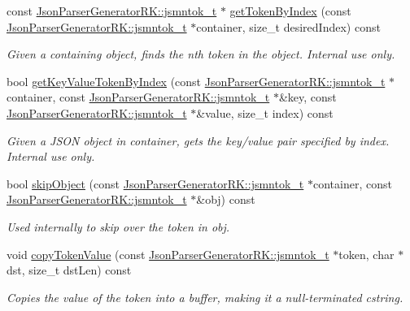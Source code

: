 \begin{DoxyCompactItemize}
const \hyperlink{struct_json_parser_generator_r_k_1_1jsmntok__t}{Json\+Parser\+Generator\+R\+K\+::jsmntok\+\_\+t} $\ast$ \hyperlink{class_json_parser_a588d9c4fcfe9179db67ca42f5ba5229d}{get\+Token\+By\+Index} (const \hyperlink{struct_json_parser_generator_r_k_1_1jsmntok__t}{Json\+Parser\+Generator\+R\+K\+::jsmntok\+\_\+t} $\ast$container, size\+\_\+t desired\+Index) const
\begin{DoxyCompactList}\small\item\em Given a containing object, finds the nth token in the object. Internal use only. \end{DoxyCompactList}\item 
bool \hyperlink{class_json_parser_a946929ab0c54eed7e7c8697e9304d553}{get\+Key\+Value\+Token\+By\+Index} (const \hyperlink{struct_json_parser_generator_r_k_1_1jsmntok__t}{Json\+Parser\+Generator\+R\+K\+::jsmntok\+\_\+t} $\ast$container, const \hyperlink{struct_json_parser_generator_r_k_1_1jsmntok__t}{Json\+Parser\+Generator\+R\+K\+::jsmntok\+\_\+t} $\ast$\&key, const \hyperlink{struct_json_parser_generator_r_k_1_1jsmntok__t}{Json\+Parser\+Generator\+R\+K\+::jsmntok\+\_\+t} $\ast$\&value, size\+\_\+t index) const
\begin{DoxyCompactList}\small\item\em Given a J\+S\+ON object in container, gets the key/value pair specified by index. Internal use only. \end{DoxyCompactList}\item 
bool \hyperlink{class_json_parser_a182ab93b3639f0a99f37f9101eb48361}{skip\+Object} (const \hyperlink{struct_json_parser_generator_r_k_1_1jsmntok__t}{Json\+Parser\+Generator\+R\+K\+::jsmntok\+\_\+t} $\ast$container, const \hyperlink{struct_json_parser_generator_r_k_1_1jsmntok__t}{Json\+Parser\+Generator\+R\+K\+::jsmntok\+\_\+t} $\ast$\&obj) const
\begin{DoxyCompactList}\small\item\em Used internally to skip over the token in obj. \end{DoxyCompactList}\item 
void \hyperlink{class_json_parser_ab7f8a2873dd3a2935cf0a22133a5378f}{copy\+Token\+Value} (const \hyperlink{struct_json_parser_generator_r_k_1_1jsmntok__t}{Json\+Parser\+Generator\+R\+K\+::jsmntok\+\_\+t} $\ast$token, char $\ast$dst, size\+\_\+t dst\+Len) const
\begin{DoxyCompactList}\small\item\em Copies the value of the token into a buffer, making it a null-\/terminated cstring. \end{DoxyCompactList}\item 

\end{DoxyCompactItemize}
